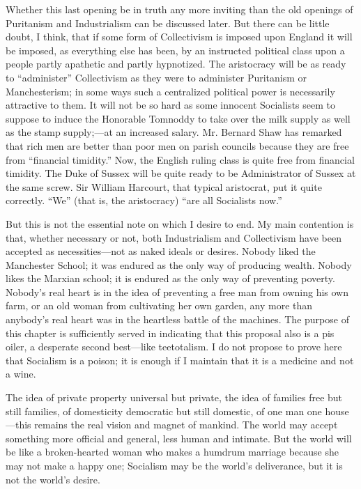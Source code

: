 \documentclass{book}
\begin{document}
Whether this last opening be in truth any more inviting than the old openings of Puritanism and Industrialism can be discussed later. But there can be little doubt, I think, that if some form of Collectivism is imposed upon England it will be imposed, as everything else has been, by an instructed political class upon a people partly apathetic and partly hypnotized. The aristocracy will be as ready to “administer” Collectivism as they were to administer Puritanism or Manchesterism; in some ways such a centralized political power is necessarily attractive to them. It will not be so hard as some innocent Socialists seem to suppose to induce the Honorable Tomnoddy to take over the milk supply as well as the stamp supply;—at an increased salary. Mr. Bernard Shaw has remarked that rich men are better than poor men on parish councils because they are free from “financial timidity.” Now, the English ruling class is quite free from financial timidity. The Duke of Sussex will be quite ready to be Administrator of Sussex at the same screw. Sir William Harcourt, that typical aristocrat, put it quite correctly. “We” (that is, the aristocracy) “are all Socialists now.”

But this is not the essential note on which I desire to end. My main contention is that, whether necessary or not, both Industrialism and Collectivism have been accepted as necessities—not as naked ideals or desires. Nobody liked the Manchester School; it was endured as the only way of producing wealth. Nobody likes the Marxian school; it is endured as the only way of preventing poverty. Nobody’s real heart is in the idea of preventing a free man from owning his own farm, or an old woman from cultivating her own garden, any more than anybody’s real heart was in the heartless battle of the machines. The purpose of this chapter is sufficiently served in indicating that this proposal also is a pis oiler, a desperate second best—like teetotalism. I do not propose to prove here that Socialism is a poison; it is enough if I maintain that it is a medicine and not a wine.

The idea of private property universal but private, the idea of families free but still families, of domesticity democratic but still domestic, of one man one house—this remains the real vision and magnet of mankind. The world may accept something more official and general, less human and intimate. But the world will be like a broken-hearted woman who makes a humdrum marriage because she may not make a happy one; Socialism may be the world’s deliverance, but it is not the world’s desire.
\end{document}
